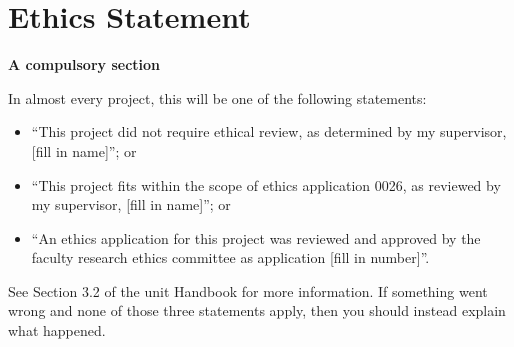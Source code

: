 \documentclass[oneside,%
                    author={Malak Hajji},
                    degree={BSc},
                    title={Designing An Accessible Computational Toolkit For Students},
                  subtitle={With Mixed Visual Abilities}]{dissertation}
\begin{document}


\makedecl





\tableofcontents
\listoffigures
\listoftables




\chapter*{Ethics Statement}

{\bf A compulsory section} 
\vspace{1cm} 

In almost every project, this will be one of the following statements:
    \begin{itemize}
        \item ``This project did not require ethical review, as determined by my supervisor, [fill in name]''; or
        \item ``This project fits within the scope of ethics application 0026, as reviewed by my supervisor, [fill in name]''; or
        \item ``An ethics application for this project was reviewed and approved by the faculty research ethics committee as application [fill in number]''.
    \end{itemize}
    
See Section 3.2 of the unit Handbook for more information. If something went wrong and none of those three statements apply, then you should instead explain what happened.





\end{document}
